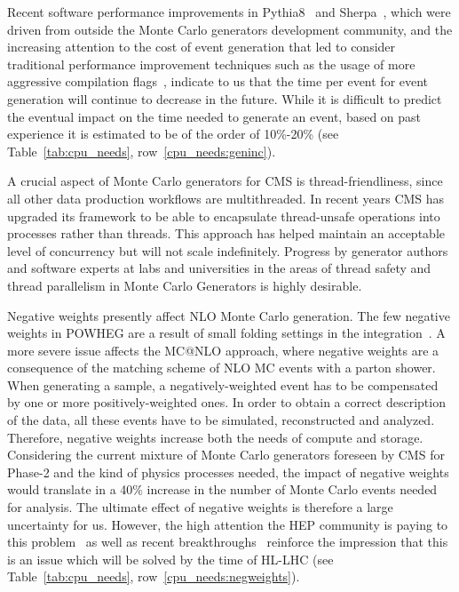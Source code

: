 \documentclass{cmspaper}
\begin{document}
Recent software performance improvements in Pythia8~\cite{dimapythia82020} and Sherpa~\cite{sherpaopt2020}, which were driven from outside the Monte Carlo generators development community, and the increasing attention to the cost of event generation that led to consider traditional performance improvement techniques such as the usage of more aggressive compilation flags~\cite{valassi2021design}, indicate to us that the time per event for event generation will continue to decrease in the future. While it is difficult to predict the eventual impact on the time needed to generate an event, based on past experience it is estimated to be of the order of 10\%-20\% (see Table~\ref{tab:cpu_needs}, row~\ref{cpu_needs:geninc}). 

A crucial aspect of Monte Carlo generators for CMS is thread-friendliness, since all other data production workflows are multithreaded. In recent years CMS has upgraded its framework to be able to encapsulate thread-unsafe operations into processes rather than threads. This approach has helped maintain an acceptable level of concurrency but will not scale indefinitely. Progress by generator authors and software experts at labs and universities in the areas of thread safety and thread parallelism in Monte Carlo Generators is highly desirable.

Negative weights presently affect NLO Monte Carlo generation. The few negative weights in POWHEG are a result of small folding settings in the integration~\cite{Frixione:2007nu}. A more severe issue affects the MC@NLO approach, where negative weights are a consequence of the matching scheme of NLO MC events with a parton shower. When generating a sample, a negatively-weighted event has to be compensated by one or more positively-weighted ones. In order to obtain a correct description of the data, all these events have to be simulated, reconstructed and analyzed. Therefore, negative weights increase both the needs of compute and storage. Considering the current mixture of Monte Carlo generators foreseen by CMS for Phase-2 and the kind of physics processes needed, the impact of negative weights would translate in a 40\% increase in the number of Monte Carlo events needed for analysis.
The ultimate effect of negative weights is therefore a large uncertainty for us. However, the high attention the HEP community is paying to this problem~\cite{Frederix2020} as well as recent breakthroughs~\cite{Nason2020} reinforce the impression that this is an issue which will be solved by the time of HL-LHC (see Table~\ref{tab:cpu_needs}, row~\ref{cpu_needs:negweights}). 
\end{document}
